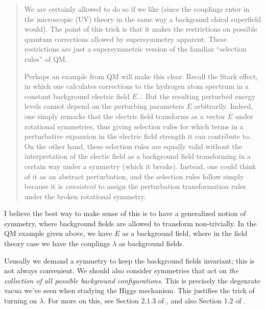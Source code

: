 \documentclass[a4paper
	,10pt
]{article}
\begin{document}
	\begin{quote}
	We are certainly allowed to do so if we like (since the couplings enter in the microscopic (UV) theory in the same way a backgound chiral superfield would). The point of this trick is that it makes the restrictions on possible quantum corrections allowed by supersymmetry apparent. These restrictions are just a supersymmetric version of the familiar “selection rules” of QM.
		
	Perhaps an example from QM will make this clear: Recall the Stark effect, in which one calculates corrections to the hydrogen atom spectrum in a constant background electric field $E$... But the resulting perturbed energy levels cannot depend on the perturbing parameters $E$ arbitrarily. Indeed, one simply remarks that the electric field transforms as a vector $E$ under rotational symmetries, thus giving selection rules for which terms in a perturbative expansion in the electric field strength it can contribute to. On the other hand, these selection rules are equally valid without the interpretation of the electic field as a background field transforming in a certain way under a symmetry (which it breaks). Instead, one could think of it as an abstract perturbation, and the selection rules follow simply because it is \textit{consistent} to assign the perturbation transformation rules under the broken rotational symmetry.
	\end{quote}
	
	I believe the best way to make sense of this is to have a generalized notion of symmetry, where background fields are allowed to transform non-trivially. In the QM example given above, we have $E$ as a background field, where in the field theory case we have the couplings $\lambda$ as background fields. 
	
	Ususally we demand a symmetry to keep the background fields invariant; this is not always convenient. We should also consider symmetries that act on \textit{the collection of all possible background configurations}. This is precisely the degenrate vacua we've seen when studying the Higgs mechanism. This justifies the trick of turning on $\lambda$. For more on this, see Section 2.1.3 of \textcite{Banados:2016zim}, and also Section 1.2 of \cite{Lai:2021abc}. 
	
	
\vspace{1.2\baselineskip}
\pagebreak[4]
\raggedright
\printbibliography[%
	,heading = bibintoc
]
\end{document}

